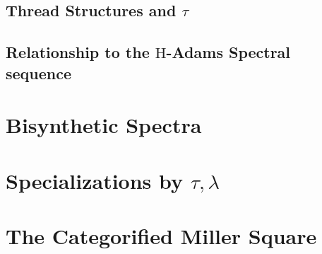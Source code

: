 \documentclass[10pt]{amsart}
\theoremstyle{definition}
\numberwithin{figure}{section}
\numberwithin{equation}{section}
\theoremstyle{cited}
\renewcommand{\H}{\mathrm{H}}
\begin{document}
\subsection{Thread Structures and $\tau$}

\subsection{Relationship to the $\H$-Adams Spectral sequence}

\section{Bisynthetic Spectra}

\section{Specializations by $\tau,\lambda$}

\section{The Categorified Miller Square}
\end{document}
